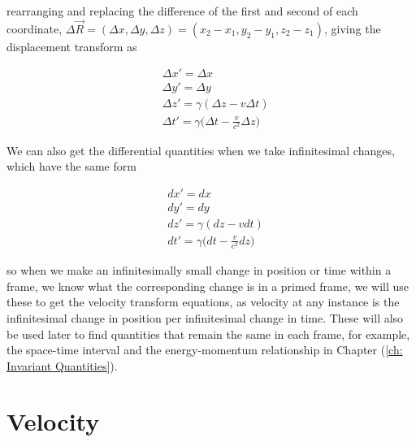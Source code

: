 rearranging and replacing the difference of the first and second of each coordinate, ${\Delta}{\vec{R}} = ({\Delta}x,{\Delta}y,{\Delta}z) = (x_2-x_1,y_2-y_1,z_2-z_1)$, giving the displacement transform as

\begin{equation}
	\label{eq: interval of Coordinates}
	\begin{aligned}
		 & \Delta x{'} = {\Delta x}                                                 \\
		 & \Delta {y{'}} = {\Delta y}                                                 \\
		 & \Delta {z{'}} = {\gamma} ( {\Delta z}- {v} \Delta t)                       \\
		 & {\Delta t{'}} = {\gamma} \bigg( \Delta t-\frac{v}{{c}^2} {\Delta z} \bigg)
	\end{aligned}
\end{equation}

We can also get the differential quantities when we take infinitesimal changes, which have the same form

\begin{equation}
	\label{eq: Infintesmal interval of Coordinates}
	\begin{aligned}
		 & {dx{'}} = {dx}                                        \\
		 & {dy{'}} = {dy}                                        \\
		 & {dz{'}} = {\gamma} (dz- {v}dt)                        \\
		 & {dt{'}} = {\gamma} \bigg(dt-\frac{v}{{c}^2} dz \bigg)
	\end{aligned}
\end{equation}

so when we make an infinitesimally small change in position or time within a frame, we know what the corresponding change is in a primed frame, we will use these to get the velocity transform equations, as velocity at any instance is the infinitesimal change in position per infinitesimal change in time.
These will also be used later to find quantities that remain the same in each frame, for example, the space-time interval and the energy-momentum relationship in Chapter (\ref{ch: Invariant Quantities}).

\section{Velocity} \label{sect: Velocity}

